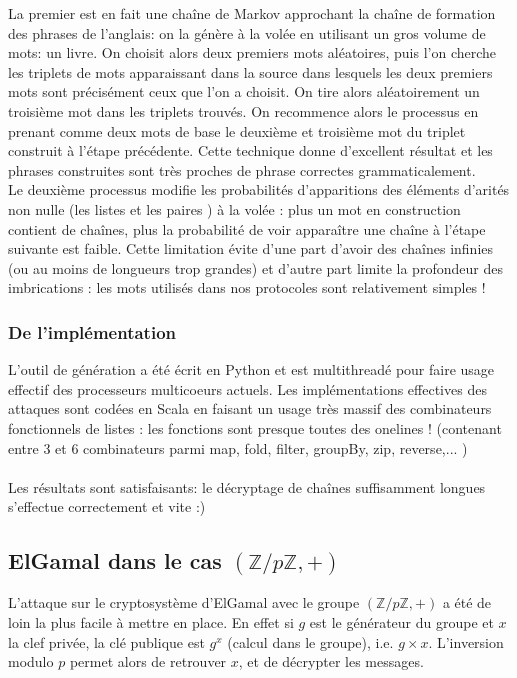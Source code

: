 \documentclass[11pt]{article} %
\begin{document}
    La premier est en fait une chaîne de Markov approchant la chaîne de formation des phrases de l'anglais: on la génère à la volée en utilisant un gros volume de mots: un livre. On choisit alors deux premiers mots aléatoires, puis l'on cherche les triplets de mots apparaissant dans la source dans lesquels les deux premiers mots sont précisément ceux que l'on a choisit. On tire alors aléatoirement un troisième mot dans les triplets trouvés. On recommence alors le processus en prenant comme deux mots de base le deuxième et troisième mot du triplet construit à l'étape précédente. Cette technique donne d'excellent résultat et les phrases construites sont très proches de phrase correctes grammaticalement. \\

    Le deuxième processus modifie les probabilités d'apparitions des éléments d'arités non nulle (les listes et les paires ) à la volée : plus un mot en construction contient de chaînes, plus la probabilité de voir apparaître une chaîne à l'étape suivante est faible.  Cette limitation évite d'une part d'avoir des chaînes infinies (ou au moins de longueurs trop grandes) et d'autre part limite la profondeur des imbrications : les mots utilisés dans nos protocoles sont relativement simples !


  \subsubsection{De l'implémentation}

  L'outil de génération a été écrit en Python et est multithreadé pour faire usage effectif des processeurs multicoeurs actuels. Les implémentations effectives des attaques sont codées en Scala en faisant un usage très massif des combinateurs fonctionnels de listes : les fonctions sont presque toutes des onelines ! (contenant entre 3 et 6 combinateurs parmi map, fold, filter, groupBy, zip, reverse,... )\\\\

  Les résultats sont satisfaisants: le décryptage de chaînes suffisamment longues s'effectue correctement et vite :)

\subsection{ElGamal dans le cas $(\mathbb{Z}/p\mathbb{Z}, +)$}

L'attaque sur le cryptosystème d'ElGamal avec le groupe $(\mathbb{Z}/p\mathbb{Z}, +)$ a été de loin la plus facile à mettre en place. En effet si $g$ est le générateur du groupe et $x$ la clef privée, la clé publique est $g^x$ (calcul dans le groupe), i.e. $g\times x$. L'inversion modulo $p$ permet alors de retrouver $x$, et de décrypter les messages.
\end{document}
